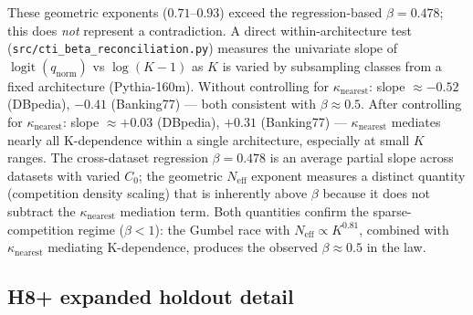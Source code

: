 \documentclass{article}
\DeclareMathOperator{\logit}{logit}
\begin{document}
These geometric exponents ($0.71$--$0.93$) exceed the regression-based $\beta=0.478$; this does
\emph{not} represent a contradiction. A direct within-architecture test
(\texttt{src/cti\_beta\_reconciliation.py}) measures the univariate slope of $\logit(q_\mathrm{norm})$
vs $\log(K-1)$ as $K$ is varied by subsampling classes from a fixed
architecture (Pythia-160m).
Without controlling for $\kappa_\mathrm{nearest}$: slope $\approx-0.52$ (DBpedia), $-0.41$
(Banking77) --- both consistent with $\beta\approx0.5$.
After controlling for $\kappa_\mathrm{nearest}$: slope $\approx+0.03$ (DBpedia), $+0.31$
(Banking77) --- $\kappa_\mathrm{nearest}$ mediates nearly all K-dependence within a single
architecture, especially at small $K$ ranges.
The cross-dataset regression $\beta=0.478$ is an average partial slope across datasets with
varied $C_0$; the geometric $N_\mathrm{eff}$ exponent measures a distinct quantity
(competition density scaling) that is inherently above $\beta$ because it does not subtract
the $\kappa_\mathrm{nearest}$ mediation term.
Both quantities confirm the sparse-competition regime ($\beta<1$):
the Gumbel race with $N_\mathrm{eff}\propto K^{0.81}$, combined with $\kappa_\mathrm{nearest}$
mediating K-dependence, produces the observed $\beta\approx0.5$ in the law.

\subsection{H8+ expanded holdout detail}
\label{subsec:h8plus-detail}
\end{document}
